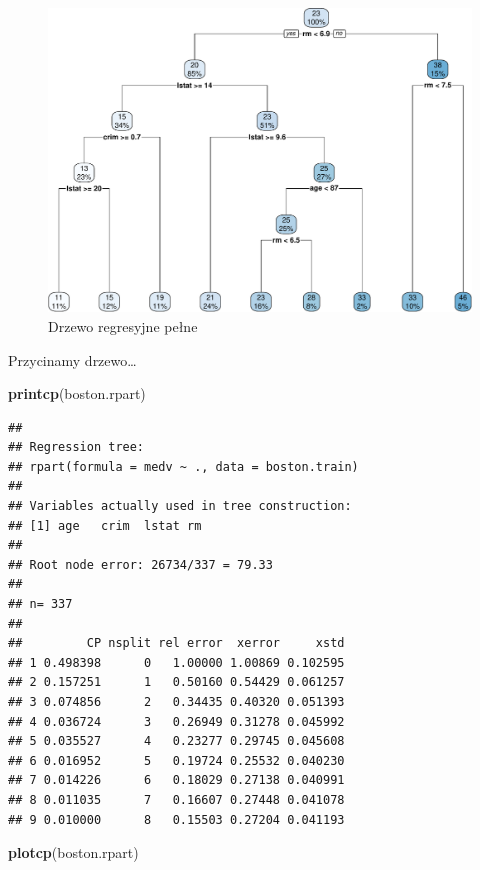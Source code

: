 \documentclass[
]{book}
\newenvironment{Shaded}{\begin{snugshade}}{\end{snugshade}}
\newcommand{\FunctionTok}[1]{\textcolor[rgb]{0.13,0.29,0.53}{\textbf{#1}}}
\newcommand{\NormalTok}[1]{#1}
\theoremstyle{plain}
\theoremstyle{definition}
\theoremstyle{definition}
\theoremstyle{definition}
\theoremstyle{definition}
\theoremstyle{definition}
\theoremstyle{remark}
\begin{document}
\begin{figure}
\centering
\includegraphics{EksploracjaDanych_files/figure-latex/unnamed-chunk-32-1.pdf}
\caption{\label{fig:unnamed-chunk-32}Drzewo regresyjne pełne}
\end{figure}

Przycinamy drzewo\ldots{}

\begin{Shaded}
\begin{Highlighting}[]
\FunctionTok{printcp}\NormalTok{(boston.rpart)}
\end{Highlighting}
\end{Shaded}

\begin{verbatim}
## 
## Regression tree:
## rpart(formula = medv ~ ., data = boston.train)
## 
## Variables actually used in tree construction:
## [1] age   crim  lstat rm   
## 
## Root node error: 26734/337 = 79.33
## 
## n= 337 
## 
##         CP nsplit rel error  xerror     xstd
## 1 0.498398      0   1.00000 1.00869 0.102595
## 2 0.157251      1   0.50160 0.54429 0.061257
## 3 0.074856      2   0.34435 0.40320 0.051393
## 4 0.036724      3   0.26949 0.31278 0.045992
## 5 0.035527      4   0.23277 0.29745 0.045608
## 6 0.016952      5   0.19724 0.25532 0.040230
## 7 0.014226      6   0.18029 0.27138 0.040991
## 8 0.011035      7   0.16607 0.27448 0.041078
## 9 0.010000      8   0.15503 0.27204 0.041193
\end{verbatim}

\begin{Shaded}
\begin{Highlighting}[]
\FunctionTok{plotcp}\NormalTok{(boston.rpart)}
\end{Highlighting}
\end{Shaded}
\end{document}
